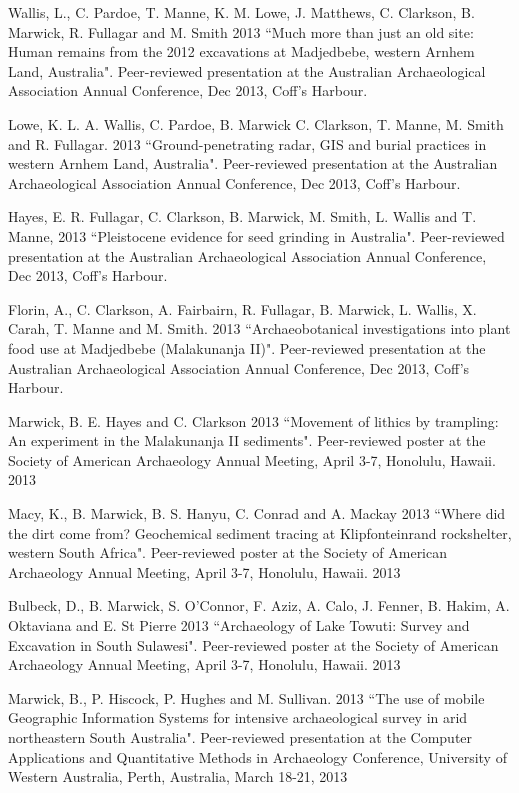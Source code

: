 {\ind Wallis, L., C. Pardoe, T. Manne, K. M. Lowe, J. Matthews, C.   Clarkson, B. Marwick, R. Fullagar and M. Smith 2013 ``Much more than just an old site: Human remains from the 2012 excavations at Madjedbebe, western Arnhem Land, Australia". Peer-reviewed presentation at the Australian Archaeological Association Annual Conference, Dec 2013, Coff’s Harbour.

\ind Lowe, K. L. A. Wallis, C. Pardoe, B. Marwick C. Clarkson, T. Manne, M. Smith and R. Fullagar. 2013 ``Ground-penetrating radar, GIS and burial practices in western Arnhem Land, Australia". Peer-reviewed presentation at the Australian Archaeological Association Annual Conference, Dec 2013, Coff’s Harbour.

\ind Hayes, E.  R. Fullagar, C. Clarkson, B. Marwick, M. Smith, L. Wallis and T. Manne, 2013 ``Pleistocene evidence for seed grinding in Australia". Peer-reviewed presentation at the Australian Archaeological Association Annual Conference, Dec 2013, Coff’s Harbour.

\ind Florin, A., C. Clarkson, A. Fairbairn, R. Fullagar, B. Marwick, L. Wallis, X. Carah, T. Manne and M. Smith. 2013 ``Archaeobotanical investigations into plant food use at Madjedbebe (Malakunanja II)". Peer-reviewed presentation at the Australian Archaeological Association Annual Conference, Dec 2013, Coff’s Harbour.

\ind Marwick, B. E. Hayes and C. Clarkson 2013 ``Movement of lithics by trampling: An experiment in the Malakunanja II sediments". Peer-reviewed poster at the Society of American Archaeology Annual Meeting, April 3-7, Honolulu, Hawaii. 2013

\ind Macy, K., B. Marwick, B. S. Hanyu, C. Conrad and A. Mackay 2013 ``Where did the dirt come from? Geochemical sediment tracing at Klipfonteinrand rockshelter, western South Africa". Peer-reviewed poster at the Society of American Archaeology Annual Meeting, April 3-7, Honolulu, Hawaii. 2013

\ind Bulbeck, D., B. Marwick, S. O'Connor, F. Aziz, A. Calo, J. Fenner, B. Hakim, A. Oktaviana and E. St Pierre 2013 ``Archaeology of Lake Towuti: Survey and Excavation in South Sulawesi". Peer-reviewed poster at the Society of American Archaeology Annual Meeting, April 3-7, Honolulu, Hawaii. 2013

\ind Marwick, B., P. Hiscock, P. Hughes and M. Sullivan. 2013 ``The use of mobile Geographic Information Systems for intensive archaeological survey in arid northeastern South Australia". Peer-reviewed presentation at the Computer Applications and Quantitative Methods in Archaeology Conference, University of Western Australia, Perth, Australia, March 18-21, 2013

}
